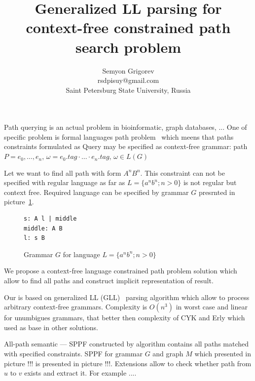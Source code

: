 \documentclass{sig-alternate} %
\begin{document}
\makeatletter
\def\@copyrightspace{\relax}
\makeatother

\title{Generalized LL parsing for context-free constrained path search problem}

\sloppy

\author{Semyon Grigorev\\
rsdpisuy@gmail.com\\
Saint Petersburg State University, Russia}

\maketitle

Path querying is an actual problem in bioinformatic, graph databases, ... One of specific problem is formal languages path problem~\cite{DirOfBigGraphAnalysis} which meens that paths constraints formulated as 
Query may be specified as context-free grammar: path $P = e_0,\dots,e_n$, $\omega = e_0.tag \cdot \dots \cdot e_n.tag$, $\omega \in L(G)$ 

Let we want to find all path with form $A^n B^n$. This constraint can not be specified with regular language as far as $L=\{a^n b^n; n>0\}$ is not regular but context free.
Required language can be specified by grammar $G$ presrnted in picture~\ref{grammarG}.

\begin{figure}[h]
   \begin{center}
\begin{verbatim}
s: A l | middle
middle: A B
l: s B
\end{verbatim}
   \caption{Grammar $G$ for language $L=\{a^n b^n; n>0\}$}
   \label{grammarG}        
   \end{center}
\end{figure}

We propose a context-free language constrained path problem solution which allow to find all paths and construct implicit representation of result. 

Our is based on generalized LL (GLL)~\cite{GLL} parsing algorithm which allow to process arbitrary context-free grammars.
Complexity is $O(n^3)$ in worst case and linear for unumbigues grammars, that better then complexity of CYK and Erly which used as base in other solutions.

All-path semantic --- SPPF constructed by algorithm contains all paths matched with specified constraints. SPPF for grammar $G$ and graph $M$ which presented in picture !!! is presented in picture !!!. 
Extensions allow to check whether path from $u$ to $v$ exists and extract it. For example ....
\end{document}
